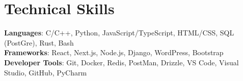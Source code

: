\documentclass[letterpaper,11pt]{article}
\makeatletter
\newcommand{\resumeItem}[1]{
  \item\small{
    {#1 \vspace{-2pt}}
  }
}
\newcommand{\resumeSubheading}[4]{
  \vspace{-2pt}\item
    \begin{tabular*}{0.97\textwidth}[t]{l@{\extracolsep{\fill}}r}
      \textbf{#1} & #2 \\
      \textit{\small#3} & \textit{\small #4} \\
    \end{tabular*}\vspace{-7pt}
}
\newcommand{\resumeSubSubheading}[2]{
    \item
    \begin{tabular*}{0.97\textwidth}{l@{\extracolsep{\fill}}r}
      \textit{\small#1} & \textit{\small #2} \\
    \end{tabular*}\vspace{-7pt}
}
\newcommand{\resumeSubHeadingListEnd}{\end{itemize}}
\newcommand{\resumeItemListStart}{\begin{itemize}}
\newcommand{\resumeItemListEnd}{\end{itemize}\vspace{-5pt}}
\makeatother
\begin{document}




%
\section{Technical Skills}
 \begin{itemize}[leftmargin=0.15in, label={}]
    \small{\item{
     \textbf{Languages}{: C/C++, Python, JavaScript/TypeScript, HTML/CSS, SQL (PostGre), Rust, Bash} \\
     \textbf{Frameworks}{: React, Next.js, Node.js, Django, WordPress, Bootstrap} \\
     \textbf{Developer Tools}{: Git, Docker, Redis, PostMan, Drizzle, VS Code, Visual Studio, GitHub, PyCharm} \\
    }}
 \end{itemize}
\end{document}
